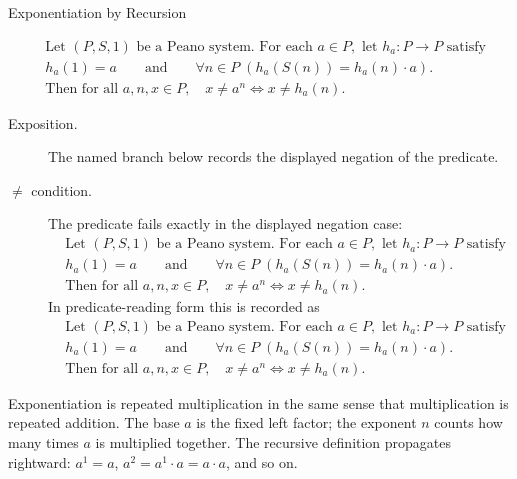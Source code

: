\begin{topicbox}{Exponentiation by Recursion}
\begin{remark*}
\[
\begin{aligned}
&\text{Let } (P,S,1) \text{ be a Peano system. For each } a \in P,
\text{ let } h_a : P \to P \text{ satisfy}\\
&h_a(1)=a
\qquad\text{and}\qquad
\forall n \in P\;(h_a(S(n))=h_a(n)\cdot a).\\
&\text{Then for all } a,n,x \in P,\quad
x \neq a^n \Longleftrightarrow x \neq h_a(n).
\end{aligned}
\]
\end{remark*}

\begin{remark*}
\begin{description}
  \item[Exposition.] The named branch below records the displayed negation of the predicate.
  \item[\(\neq\) condition.] The predicate fails exactly in the displayed negation case:
  \[
  \begin{aligned}
  &\text{Let } (P,S,1) \text{ be a Peano system. For each } a \in P,
  \text{ let } h_a : P \to P \text{ satisfy}\\
  &h_a(1)=a
  \qquad\text{and}\qquad
  \forall n \in P\;(h_a(S(n))=h_a(n)\cdot a).\\
  &\text{Then for all } a,n,x \in P,\quad
  x \neq a^n \Longleftrightarrow x \neq h_a(n).
  \end{aligned}
  \]
  In predicate-reading form this is recorded as
  \[
  \begin{aligned}
  &\text{Let } (P,S,1) \text{ be a Peano system. For each } a \in P,
  \text{ let } h_a : P \to P \text{ satisfy}\\
  &h_a(1)=a
  \qquad\text{and}\qquad
  \forall n \in P\;(h_a(S(n))=h_a(n)\cdot a).\\
  &\text{Then for all } a,n,x \in P,\quad
  x \neq a^n \Longleftrightarrow x \neq h_a(n).
  \end{aligned}
  \]
\end{description}
\end{remark*}

\begin{remark*}[Interpretation]
Exponentiation is repeated multiplication in the same sense that multiplication
is repeated addition. The base $a$ is the fixed left factor; the exponent $n$
counts how many times $a$ is multiplied together. The recursive definition
propagates rightward: $a^1 = a$, $a^2 = a^1 \cdot a = a \cdot a$, and so on.
\end{remark*}


\end{topicbox}
